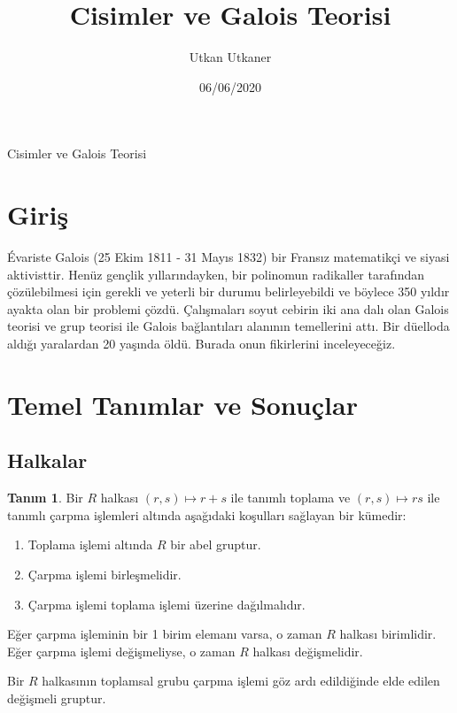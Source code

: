 \documentclass{article}
\title{Cisimler ve Galois Teorisi}
\author{Utkan Utkaner}
\date{06/06/2020}
\theoremstyle{definition}
\newtheorem{defn}{Tanım}[section]
\theoremstyle{remark}
\begin{document}
    \maketitle
	
	\newpage
	
	\renewcommand{\contentsname}{İçindekiler}
	\tableofcontents
	
	\newpage
	
	{Cisimler ve Galois Teorisi}
	\renewcommand{\sectionmark}[1]{}
	
	\section{Giriş}
	
	    Évariste Galois (25 Ekim 1811 - 31 Mayıs 1832) bir Fransız matematikçi ve siyasi aktivisttir. Henüz gençlik yıllarındayken, bir polinomun radikaller tarafından çözülebilmesi için gerekli ve yeterli bir durumu belirleyebildi ve böylece 350 yıldır ayakta olan bir problemi çözdü. Çalışmaları soyut cebirin iki ana dalı olan Galois teorisi ve grup teorisi ile Galois bağlantıları alanının temellerini attı. Bir düelloda aldığı yaralardan 20 yaşında öldü. Burada onun fikirlerini inceleyeceğiz.
	    
	\section{Temel Tanımlar ve Sonuçlar}
	
	    \subsection{Halkalar}
	
    	    \begin{defn}
    	        Bir $R$ halkası $(r, s) \mapsto r + s$ ile tanımlı toplama ve $(r, s) \mapsto rs$ ile tanımlı çarpma işlemleri altında aşağıdaki koşulları sağlayan bir kümedir:
    	        \begin{enumerate}
        	    \renewcommand{\labelenumi}{(\roman{enumi})}
        			\item Toplama işlemi altında $R$ bir abel gruptur.
        			\item Çarpma işlemi birleşmelidir.
        			\item Çarpma işlemi toplama işlemi üzerine dağılmalıdır.
        		\end{enumerate}
        		Eğer çarpma işleminin bir 1 birim elemanı varsa, o zaman $R$ halkası birimlidir.
        		Eğer çarpma işlemi değişmeliyse, o zaman $R$ halkası değişmelidir.\par
        		Bir $R$ halkasının toplamsal grubu çarpma işlemi göz ardı edildiğinde elde edilen değişmeli gruptur.
        	\end{defn}
        	
\end{document}

